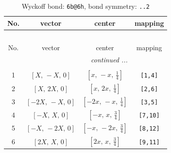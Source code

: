 \documentclass[fleqn,8pt]{jsarticle}
\begin{document}
\begin{longtable}{cccc}
\caption{Wyckoff bond: {\tt 6b@6h}, bond symmetry: {\tt ..2}}
 \\
 \hline \hline
No. & vector & center & mapping \\ \hline \endfirsthead

\multicolumn{3}{l}{\tablename\ \thetable{}} \\
 \hline \hline
No. & vector & center & mapping \\ \hline \endhead

 \hline \hline
\multicolumn{3}{r}{\footnotesize\it continued ...} \\ \endfoot

 \hline \hline
\multicolumn{3}{r}{} \\ \endlastfoot

1 & $\left[ X,\, - X,\, 0 \right]$ & $\left[ x,\, - x,\, \frac{1}{4} \right]$ & {\tt [1,4]} \\ \hline
2 & $\left[ X,\, 2 X,\, 0 \right]$ & $\left[ x,\, 2 x,\, \frac{1}{4} \right]$ & {\tt [2,6]} \\ \hline
3 & $\left[ - 2 X,\, - X,\, 0 \right]$ & $\left[ - 2 x,\, - x,\, \frac{1}{4} \right]$ & {\tt [3,5]} \\ \hline
4 & $\left[ - X,\, X,\, 0 \right]$ & $\left[ - x,\, x,\, \frac{3}{4} \right]$ & {\tt [7,10]} \\ \hline
5 & $\left[ - X,\, - 2 X,\, 0 \right]$ & $\left[ - x,\, - 2 x,\, \frac{3}{4} \right]$ & {\tt [8,12]} \\ \hline
6 & $\left[ 2 X,\, X,\, 0 \right]$ & $\left[ 2 x,\, x,\, \frac{3}{4} \right]$ & {\tt [9,11]} \\
\end{longtable}
\renewcommand{\arraystretch}{1.2}
\end{document}
